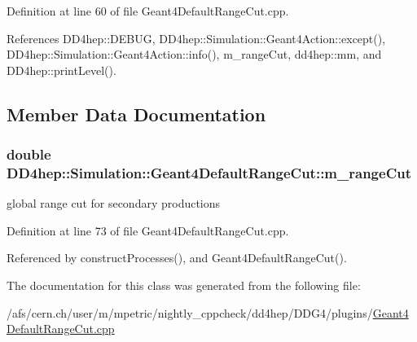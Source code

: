 Definition at line 60 of file Geant4DefaultRangeCut.cpp.

References DD4hep::DEBUG, DD4hep::Simulation::Geant4Action::except(), DD4hep::Simulation::Geant4Action::info(), m\_\-rangeCut, dd4hep::mm, and DD4hep::printLevel().

\subsection{Member Data Documentation}
\hypertarget{class_d_d4hep_1_1_simulation_1_1_geant4_default_range_cut_a3a03ddf8f442cefe710b25930bd07f50}{
\subsubsection[{m\_\-rangeCut}]{\setlength{\rightskip}{0pt plus 5cm}double {\bf DD4hep::Simulation::Geant4DefaultRangeCut::m\_\-rangeCut}}}
\label{class_d_d4hep_1_1_simulation_1_1_geant4_default_range_cut_a3a03ddf8f442cefe710b25930bd07f50}


global range cut for secondary productions 

Definition at line 73 of file Geant4DefaultRangeCut.cpp.

Referenced by constructProcesses(), and Geant4DefaultRangeCut().

The documentation for this class was generated from the following file:\begin{DoxyCompactItemize}
\item 
/afs/cern.ch/user/m/mpetric/nightly\_\-cppcheck/dd4hep/DDG4/plugins/\hyperlink{_geant4_default_range_cut_8cpp}{Geant4DefaultRangeCut.cpp}\end{DoxyCompactItemize}
